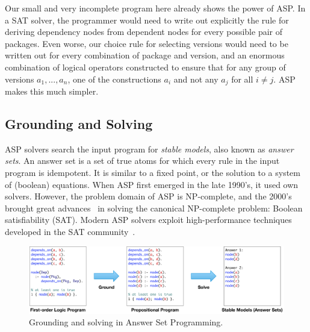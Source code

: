 Our small and very incomplete program here already shows the power of ASP. In a SAT
solver, the programmer would need to write out explicitly the rule for deriving
dependency nodes from dependent nodes for every possible pair of packages. Even worse,
our choice rule for selecting versions would need to be written out for every
combination of package and version, and an enormous combination of logical operators
constructed to ensure that for any group of versions \texttt{$a_1, ..., a_n$}, one of
the constructions \texttt{$a_i$} and not any \texttt{$a_j$} for all $i\neq{j}$. ASP
makes this much simpler.


\subsection{Grounding and Solving}

ASP solvers search the input program for {\it stable models}, also known as
\textit{answer sets}. An answer set is a set of true atoms for which every rule in the
input program is idempotent. It is similar to a fixed point, or the solution to a system
of (boolean) equations. When ASP first emerged in the late 1990's, it used own solvers.
However, the problem domain of ASP is NP-complete, and the 2000's brought great
advances~\cite{moskewicz2001chaff} in solving the canonical NP-complete problem: Boolean
satisfiability (SAT). Modern ASP solvers exploit high-performance techniques developed
in the SAT community~\cite{gebser+:asp-book}.

\begin{figure}[t]
  \centering
  \includegraphics[width=.95\textwidth]{figures/asp-grounding.pdf}
  \caption{
    Grounding and solving in Answer Set Programming.
    \label{fig:ground-solve}
    \vspace{-1em}
  }
\end{figure}

